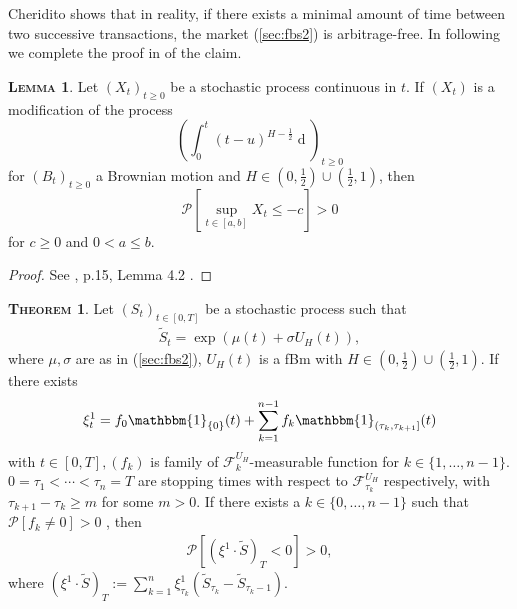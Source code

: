\documentclass[a4paper, twoside, 11pt]{article}
\theoremstyle{definition}
\newtheorem{theorem}[definition]{\scshape Theorem}
\newtheorem{lemma}[definition]{\scshape Lemma}
\newcommand{\brkt}[1]{\left({#1} \right)}
\begin{document}
	Cheridito shows that in reality, if there exists a minimal amount of time between two successive transactions, the market (\ref{sec:fbs2}) is arbitrage-free. In following we complete the proof in \cite{chridito} of the claim.
  \begin{lemma}
	Let $(X_t)_{t\ge 0}$ be a stochastic process continuous in $t$. If $(X_t)$ is a modification of the process 
	$$
	\brkt{\int_0^t (t-u)^{H-\frac{1}{2}}\mathop{dB_u}}_{t\ge 0}
	$$
	for $(B_t)_{t\ge 0}$ a Brownian motion and $H\in (0, \frac{1}{2})\cup(\frac{1}{2}, 1)$,
	then 
	$$
	\mathcal{P}[\sup\limits_{t\in[a,b]} X_t \le -c] > 0
	$$
	for $c \ge 0$ and $0< a\le b$.
	\label{sec:lll} 
  \end{lemma}

  \begin{proof}
	See \cite{chridito}, p.15, Lemma 4.2 .
  \end{proof}

  \begin{theorem}
	Let $(S_t)_{t\in[0, T]}$ be a stochastic process such that
	\begin{eqnarray}
	  \tilde{S}_t = \exp\brkt{\mu(t) + \sigma U_H(t)},
	  \label{sec:fbs}
	\end{eqnarray}
	where $\mu, \sigma$ are as in (\ref{sec:fbs2}), $U_H(t)$ is a fBm with $H\in (0, \frac{1}{2})\cup(\frac{1}{2}, 1)$. If there exists
	\begin{eqnarray*}
	\xi^1_t = f_0\mathbbm{1}_{\{0\}}(t)+\sum_{k=1}^{n-1} f_k \mathbbm{1}_{(\tau_k, \tau_{k+1}]}(t)
	\end{eqnarray*}
	with $t\in[0, T], (f_k)$ is family of  $\mathcal{F}^{U_H}_k $-measurable function for $k \in \{1,\dots,n-1\}$. $0 = \tau_1 < \cdots <\tau_n = T$ are stopping times with respect to $\mathcal{F}^{U_H}_{\tau_k} $ respectively,  with $\tau_{k+1} - \tau_k\ge m$ for some $m>0$. If there exists a $k \in \{0,\dots,n-1\}$ such that $\mathcal{P}[f_k\neq 0]>0$ , then
	\begin{eqnarray*}
	  \mathcal{P}[(\xi^1 \cdot \tilde{S})_T < 0] > 0,
	\end{eqnarray*}
	  \label{sec:claim}
	  where $(\xi^1 \cdot \tilde{S})_T := \sum_{k=1}^{n} \xi^1_{\tau_k} (\tilde{S}_{\tau_k} - \tilde{S}_{\tau_k-1})$.
  \end{theorem}
\end{document}
